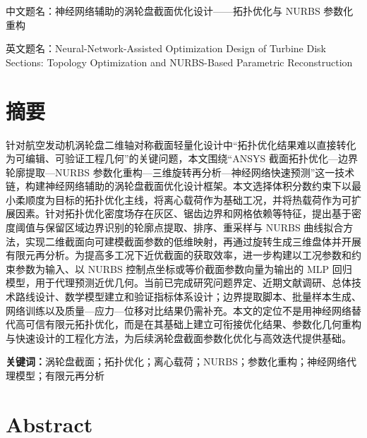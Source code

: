 \documentclass{FRB-style}
\begin{document}
\noindent
中文题名：神经网络辅助的涡轮盘截面优化设计——拓扑优化与 NURBS 参数化重构

\noindent
英文题名：Neural-Network-Assisted Optimization Design of Turbine Disk Sections: Topology Optimization and NURBS-Based Parametric Reconstruction


\clearpage
\section*{摘要}
{}

针对航空发动机涡轮盘二维轴对称截面轻量化设计中“拓扑优化结果难以直接转化为可编辑、可验证工程几何”的关键问题，本文围绕“ANSYS 截面拓扑优化—边界轮廓提取—NURBS 参数化重构—三维旋转再分析—神经网络快速预测”这一技术链，构建神经网络辅助的涡轮盘截面优化设计框架。本文选择体积分数约束下以最小柔顺度为目标的拓扑优化主线，将离心载荷作为基础工况，并将热载荷作为可扩展因素。针对拓扑优化密度场存在灰区、锯齿边界和网格依赖等特征，提出基于密度阈值与保留区域边界识别的轮廓点提取、排序、重采样与 NURBS 曲线拟合方法，实现二维截面向可建模截面参数的低维映射，再通过旋转生成三维盘体并开展有限元再分析。为提高多工况下近优截面的获取效率，进一步构建以工况参数和约束参数为输入、以 NURBS 控制点坐标或等价截面参数向量为输出的 MLP 回归模型，用于代理预测近优几何。当前已完成研究问题界定、近期文献调研、总体技术路线设计、数学模型建立和验证指标体系设计；边界提取脚本、批量样本生成、网络训练以及质量—应力—位移对比结果仍需补充。本文的定位不是用神经网络替代高可信有限元拓扑优化，而是在其基础上建立可衔接优化结果、参数化几何重构与快速设计的工程化方法，为后续涡轮盘截面参数化优化与高效迭代提供基础。

\noindent\textbf{关键词：}涡轮盘截面；拓扑优化；离心载荷；NURBS；参数化重构；神经网络代理模型；有限元再分析

\clearpage
\section*{\textbf{Abstract}}
{}
\end{document}
